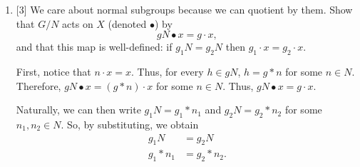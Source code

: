 \documentclass{article}
\newcommand{\inv}{^{-1}}
\newcommand{\normsub}{\lhd}
\begin{document}
\begin{enumerate}
{\begin{proof}
            Now, because we know that \(e_G \in N\), we can pick some \(n \in N\), 
            and show that \(n\inv \in N\) because 
            \begin{align}
                e_G \cdot x &= x \\
                (n\inv * n) \cdot x &= \\
                n\inv \cdot (n \cdot x) &= \\
                n\inv \cdot x &= x.
            \end{align}

            Thus, \(N < G\).

            To prove that \(N \normsub G\), we must show that for all \(g \in G\), 
            and \(n \in N\), \(g * n *g\inv \in N\). We show this by
            \begin{align}
                &(g*n*g\inv) \cdot x  \\
                &= (g*n) \cdot g\inv \cdot x \\
                &= g \cdot (n \cdot (g\inv \cdot x)).
            \end{align}

            Now, because \(n \cdot x = x\) for all \(x \in X\), we can simplify to 
            \begin{align}
                &= g \cdot g\inv \cdot x)\\
                &= e_G \cdot x = x.
            \end{align}

            Thus, \(g * n * g\inv \in N\), so \(N \normsub G\).
        \end{proof}
    }

    \item {
        [3] We care about normal subgroups because we can quotient by them. Show that \( G/ N \) acts on \( X \) (denoted \( \bullet \)) by
      \[         gN \bullet x = g \cdot x,       \] and that this map is well-defined: if \(g_1N = g_2N\) then \(g_1 \cdot x = g_2 \cdot x\).
    
        First, notice that \(n \cdot x = x\). Thus, for every \(h \in gN\), 
        \(h = g * n\) for some \(n \in N\). Therefore, \(gN \bullet x = (g * n) \cdot x\) 
        for some \(n \in N\). Thus, \(gN \bullet x = g \cdot x\).

        Naturally, we can then write \(g_1N = g_1 * n_1\) and \(g_2N = g_2 * n_2\) 
        for some \(n_1, n_2 \in N\). So, by substituting, we obtain
        \begin{align}
            g_1N &= g_2N \\
            g_1 * n_1 &= g_2 * n_2. 
        \end{align}

}
\end{enumerate}
\end{document}
